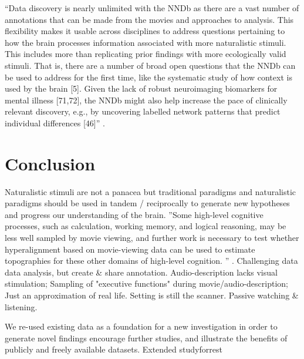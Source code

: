 ``Data discovery is nearly unlimited with the NNDb as there are a vast number of
annotations that can be made from the movies and approaches to analysis.
%
This flexibility makes it usable across disciplines to address questions
pertaining to how the brain processes information associated with more
naturalistic stimuli.
%
This includes more than replicating prior findings with more ecologically valid
stimuli.
%
That is, there are a number of broad open questions that the NNDb can be used to
address for the first time, like the systematic study of how context is used by
the brain [5].
%
Given the lack of robust neuroimaging biomarkers for mental illness [71,72], the
NNDb might also help increase the pace of clinically relevant discovery, e.g.,
by uncovering labelled network patterns that predict individual differences
[46]'' \citep{aliko2020naturalistic}.

\section{Conclusion}



%
Naturalistic stimuli are not a panacea but traditional paradigms and
naturalistic paradigms should be used in tandem / reciprocally to generate new
hypotheses and progress our understanding of the brain.
%
''Some high-level cognitive processes, such as calculation, working memory, and
logical reasoning, may be less well sampled by movie viewing, and further work
is necessary to test whether hyperalignment based on movie-viewing data can be
used to estimate topographies for these other domains of high-level cognition.
'' \citep{jiahui2020predicting}.
%
Challenging data data analysis, but create \& share annotation.
%
Audio-description lacks visual stimulation; Sampling of "executive functions"
during movie/audio-description;
%
Just an approximation of real life.
%
Setting is still the scanner.
%
Passive watching \& listening.

%
We re-used existing data as a foundation for a new investigation in
order to generate novel findings encourage further studies, and illustrate the
benefits of publicly and freely available datasets.
%
Extended studyforrest

